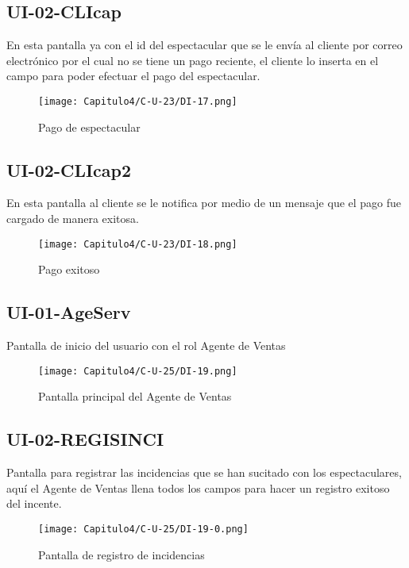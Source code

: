 \subsection{UI-02-CLIcap}
En esta pantalla ya con el id del espectacular que se le envía al cliente por correo electrónico por el cual no se tiene un pago reciente, el cliente lo inserta en el campo para poder efectuar el pago del espectacular.
\begin{figure}[htbp!]
\centering
    \texttt{[image: Capitulo4/C-U-23/DI-17.png]}
    \caption{Pago de espectacular}
    \label{fig:my_label}
\end{figure}
\clearpage



\subsection{UI-02-CLIcap2}
En esta pantalla al cliente se le notifica por medio de un mensaje que el pago fue cargado de manera exitosa.
\begin{figure}[htbp!]
\centering
    \texttt{[image: Capitulo4/C-U-23/DI-18.png]}
    \caption{Pago exitoso}
    \label{fig:my_label}
\end{figure}
\clearpage




\subsection{UI-01-AgeServ}
Pantalla de inicio del usuario con el rol Agente de Ventas
\begin{figure}[htbp!]
\centering
    \texttt{[image: Capitulo4/C-U-25/DI-19.png]}
    \caption{Pantalla principal del Agente de Ventas}
    \label{fig:my_label}
\end{figure}
\clearpage



\subsection{UI-02-REGISINCI}
Pantalla para registrar las incidencias que se han sucitado con los espectaculares, aquí el Agente de Ventas llena todos los campos para hacer un registro exitoso del incente.
\begin{figure}[htbp!]
\centering
    \texttt{[image: Capitulo4/C-U-25/DI-19-0.png]}
    \caption{Pantalla de registro de incidencias}
    \label{fig:my_label}
\end{figure}
\clearpage





